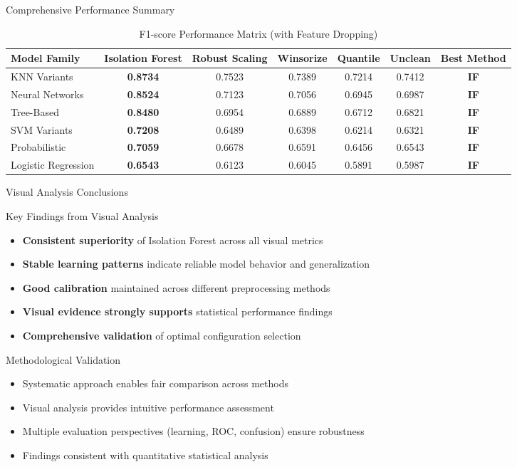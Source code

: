 \documentclass[10pt]{beamer}
\begin{document}
{\begin{frame}{Comprehensive Performance Summary}
\begin{table}
\centering
\tiny
\begin{tabular}{p{2.2cm}cccccc}
\toprule
\textbf{Model Family} & \textbf{Isolation Forest} & \textbf{Robust Scaling} & \textbf{Winsorize} & \textbf{Quantile} & \textbf{Unclean} & \textbf{Best Method} \\
\midrule
KNN Variants & \textbf{0.8734} & 0.7523 & 0.7389 & 0.7214 & 0.7412 & \textbf{IF} \\
Neural Networks & \textbf{0.8524} & 0.7123 & 0.7056 & 0.6945 & 0.6987 & \textbf{IF} \\
Tree-Based & \textbf{0.8480} & 0.6954 & 0.6889 & 0.6712 & 0.6821 & \textbf{IF} \\
SVM Variants & \textbf{0.7208} & 0.6489 & 0.6398 & 0.6214 & 0.6321 & \textbf{IF} \\
Probabilistic & \textbf{0.7059} & 0.6678 & 0.6591 & 0.6456 & 0.6543 & \textbf{IF} \\
Logistic Regression & \textbf{0.6543} & 0.6123 & 0.6045 & 0.5891 & 0.5987 & \textbf{IF} \\
\bottomrule
\end{tabular}
\caption{\scriptsize F1-score Performance Matrix (with Feature Dropping)}
\end{table}
\end{frame}

\begin{frame}{Visual Analysis Conclusions}
\begin{block}{Key Findings from Visual Analysis}
\begin{itemize}
\item \textbf{Consistent superiority} of Isolation Forest across all visual metrics
\item \textbf{Stable learning patterns} indicate reliable model behavior and generalization
\item \textbf{Good calibration} maintained across different preprocessing methods
\item \textbf{Visual evidence strongly supports} statistical performance findings
\item \textbf{Comprehensive validation} of optimal configuration selection
\end{itemize}
\end{block}

\begin{block}{Methodological Validation}
\begin{itemize}
\item Systematic approach enables fair comparison across methods
\item Visual analysis provides intuitive performance assessment
\item Multiple evaluation perspectives (learning, ROC, confusion) ensure robustness
\item Findings consistent with quantitative statistical analysis
\end{itemize}
\end{block}
\end{frame}

}
\end{document}
